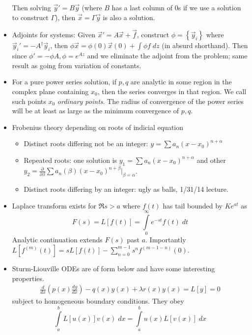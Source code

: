 \documentclass[10pt]{report}
\newcommand{\rd}[2]{\frac{d#1}{d#2}}
\newcommand{\pd}[2]{\frac{\partial #1}{\partial#2}}
\begin{document}
\begin{itemize}
        Then solving $\vec{y}' = B\vec{y}$ (where $B$ has a last column of $0$s if we use a solution to construct $\Gamma$), then $\vec{x} = \Gamma \vec{y}$ is also a solution.
    \item Adjoints for systems: Given $\vec{x}' = A\vec{x} + \vec{f}$, construct $\phi = \left\{ \vec{y}_i \right\}$ where $\vec{y}_i' = -A^\dagger \vec{y}_i$, then $\phi \vec{x} = \phi(0) \vec{x}(0) + \int \phi f\; dz$ (in absurd shorthand). Then since $\phi' = -\phi A, \phi = e^{Az}$ and we eliminate the adjoint from the problem; same result as going from variation of constants.
    \item For a pure power series solution, if $p,q$ are analytic in some region in the complex plane containing $x_0$, then the series converges in that region. We call such points $x_0$ \emph{ordinary points}. The radius of convergence of the power series will be at least as large as the minimum convergence of $p,q$.
    \item Frobenius theory depending on roots of indicial equation
        \begin{itemize}
            \item Distinct roots differing not be an integer: $ y = \sum a_n(x-x_0)^{n + \alpha}$
            \item Repeated roots: one solution is $y_1 = \sum a_n(x-x_0)^{n+\alpha}$ and other $y_2 = \pd{}{\beta}\sum a_n(\beta)(x-x_0)^{n+\beta}\big|_{\beta = \alpha}$. 
            \item Distinct roots differing by an integer: ugly as balls, 1/31/14 lecture.
        \end{itemize}
    \item Laplace transform exists for $\Re s > a$ where $f(t)$ has tail bounded by $Ke^{at}$ as 
        \begin{equation}
            F(s) = L[f(t)] = \displaystyle\int\limits_{0}^{\infty}e^{-st}f(t)\;dt
        \end{equation}
        Analytic continuation extends $F(s)$ past $a$. Importantly $L[f^{(m)}(t)] = sL[f(t)] - \sum_{n=0}^{m-1}s^{n}f^{(m-1-n)}(0)$.
    \item Sturm-Liouville ODEs are of form below and have some interesting properties.
        \begin{align}
            \rd{}{x}\left( p(x)\rd{y}{x} \right) - q(x)y(x) + \lambda r(x)y(x) = L[y] = 0
        \end{align} subject to homogeneous boundary conditions. They obey
        $$\displaystyle\int\limits_{a}^{b}L[u(x)]v(x)\;dx = \displaystyle\int\limits_{a}^{b}u(x)L[v(x)]\;dx$$

\end{itemize}
\end{document}
